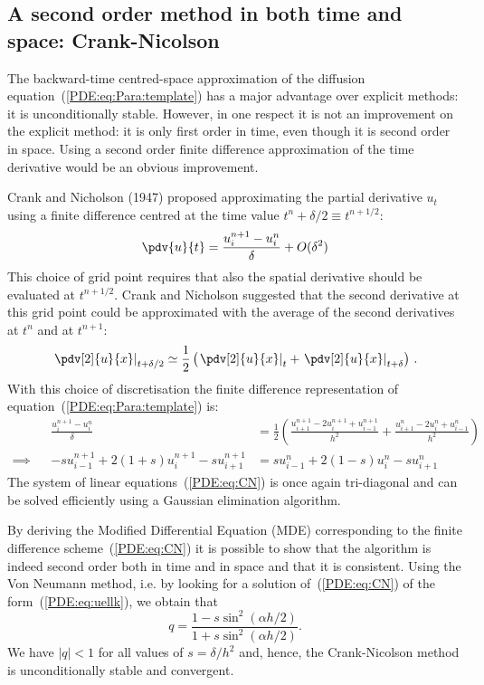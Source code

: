 \subsection[Crank-Nicolson]{A second order method in both time and space:
Crank-Nicolson}

The backward-time centred-space approximation of the diffusion
equation~(\ref{PDE:eq:Para:template}) has a major advantage over
explicit methods: it is unconditionally stable.  However, in one
respect it is not an improvement on the explicit method: it is only
first order in time, even though it is second order in space.  Using a
second order finite difference approximation of the time derivative
would be an obvious improvement.

Crank and Nicholson (1947) proposed approximating the partial
derivative $u_t$ using a finite difference centred at the time value
$t^n + \delta/2 \equiv t^{n+1/2}$:
%
\begin{equation*}
  \pdv{u}{t} = \frac{u_{i}^{n+1}-u_{i}^{n}}{\delta} + O(\delta^2)
\end{equation*}
%
This choice of grid point requires that also the spatial derivative
should be evaluated at $t^{n+1/2}$.  Crank and Nicholson suggested
that the second derivative at this grid point could be approximated
with the average of the second derivatives at $t^n$ and at $t^{n+1}$:
%
\begin{equation*}
  \left . \pdv[2]{u}{x} \right |_{t+\delta/2} \simeq
  \frac{1}{2} \left ( \left . \pdv[2]{u}{x} \right |_{t} +
    \left . \pdv[2]{u}{x} \right |_{t + \delta} \right ) \, .
\end{equation*}
%
With this choice of discretisation the finite difference
representation of equation~(\ref{PDE:eq:Para:template}) is:
%
\begin{align}
  & & \frac{u_{i}^{n+1}-u_{i}^{n}}{\delta} & = \frac{1}{2}
  \left ( \frac{u_{i+1}^{n+1} - 2 u_{i}^{n+1} + u_{i-1}^{n+1}}{h^2} +
    \frac{u_{i+1}^{n} - 2 u_{i}^{n} + u_{i-1}^{n}}{h^2} \right )
  \nonumber \\
  \implies & &
  -s u_{i-1}^{n+1} + 2(1+s) u_{i}^{n+1} - s u_{i+1}^{n+1} & =
  s u_{i-1}^{n} + 2(1-s) u_{i}^{n} - s u_{i+1}^{n}
  \label{PDE:eq:CN}
\end{align}
%
The system of linear equations~(\ref{PDE:eq:CN}) is once again
tri-diagonal and can be solved efficiently using a Gaussian
elimination algorithm.

By deriving the Modified Differential Equation (MDE) corresponding to
the finite difference scheme~(\ref{PDE:eq:CN}) it is possible to show
that the algorithm is indeed second order both in time and in space
and that it is consistent.  Using the Von Neumann method, i.e. by
looking for a solution of~(\ref{PDE:eq:CN}) of the
form~(\ref{PDE:eq:uellk}), we obtain that
%
\begin{equation*}
  q = \frac{1-s \sin^2(\alpha h/2)}{1 + s \sin^2(\alpha h/2)} .
\end{equation*}
%
We have $|q| < 1$ for all values of $s=\delta/h^2$ and, hence, the
Crank-Nicolson method is unconditionally stable and convergent.

